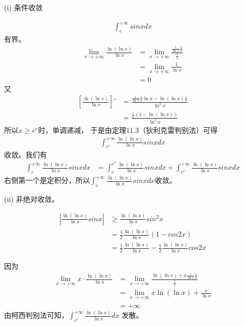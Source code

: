 \documentclass{article}
\begin{document}
\begin{itemize}
        (i) 条件收敛

        \begin{align*}
          \int_{e}^{+\infty} sin x dx
        \end{align*}
        有界。
        \begin{align*}
          \lim\limits_{x \to +\infty} \frac{\ln(\ln x)}{\ln x}
           & = \lim\limits_{x \to +\infty} \frac{\frac{1}{\ln x}\frac{1}{x}}{\frac{1}{x}} \\
           & = \lim\limits_{x \to +\infty} \frac{1}{\ln x}                                \\
           & = 0
        \end{align*}
        又
        \begin{align*}
          \left[\frac{\ln(\ln x)}{\ln x}\right]'
           & = \frac{\frac{1}{\ln x}\frac{1}{x} \ln x - \ln(\ln x) \frac{1}{x}}{\ln^2 x} \\
           & = \frac{\frac{1}{x}(1 - \ln(\ln x))}{\ln^2 x}
        \end{align*}
        所以$x \geq e^e$时，单调递减，
        于是由定理11.3（狄利克雷判别法）可得
        \begin{align*}
          \int_{e^e}^{+\infty} \frac{\ln(\ln x)}{\ln x} sin x dx
        \end{align*}
        收敛。我们有
        \begin{align*}
          \int_{e}^{+\infty} \frac{\ln(\ln x)}{\ln x} sin x dx
           & = \int_{e}^{e^e} \frac{\ln(\ln x)}{\ln x} sin x dx + \int_{e^e}^{+\infty} \frac{\ln(\ln x)}{\ln x} sin x dx
        \end{align*}
        右侧第一个是定积分，所以$\int_{e}^{+\infty} \frac{\ln(\ln x)}{\ln x} sin x dx$收敛。

        (ii) 非绝对收敛。

        \begin{align*}
          \left|\frac{\ln(\ln x)}{\ln x} sin x \right|
           & \geq \frac{\ln(\ln x)}{\ln x} sin^2 x                                               \\
           & = \frac{1}{2} \frac{\ln(\ln x)}{\ln x} (1 - cos2x)                                  \\
           & = \frac{1}{2} \frac{\ln(\ln x)}{\ln x} - \frac{1}{2} \frac{\ln(\ln x)}{\ln x} cos2x
        \end{align*}

        因为
        \begin{align*}
          \lim \limits_{x \to +\infty} x \cdot \frac{\ln(\ln x)}{\ln x}
           & = \lim \limits_{x \to +\infty} \frac{\ln(\ln x) + x \frac{1}{\ln x}\frac{1}{x}}{\frac{1}{x}} \\
           & = \lim \limits_{x \to +\infty} x \ln(\ln x) + \frac{x}{\ln x}                                \\
           & = +\infty
        \end{align*}
        由柯西判别法可知，$\int_{e^e}^{+\infty} \frac{\ln(\ln x)}{\ln x} dx$ 发散。


\end{itemize}
\end{document}
